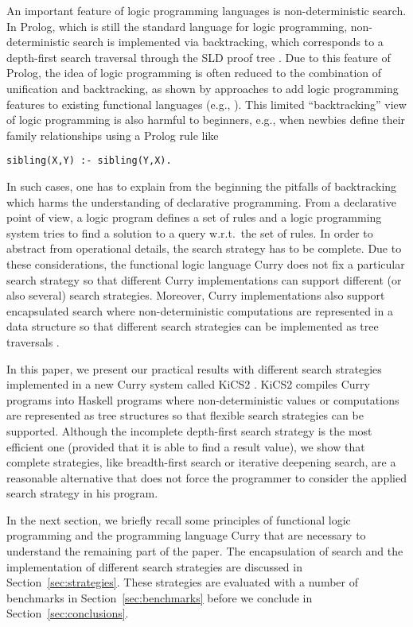 \documentclass[english]{lni}
\begin{document}
An important feature of logic programming languages
is non-deterministic search.
In Prolog, which is still the standard language for logic programming,
non-deterministic search is implemented via backtracking,
which corresponds to a depth-first search traversal
through the SLD proof tree \cite{Lloyd87}.
Due to this feature of Prolog,
the idea of logic programming is often reduced to
the combination of unification and backtracking,
as shown by approaches to add logic programming features
to existing functional languages
(e.g., \cite{ClaessenLjungloef00,Hinze01}).
This limited ``backtracking'' view of logic programming
is also harmful to beginners, e.g., when newbies
define their family relationships using a Prolog rule like
\begin{lstlisting}
sibling(X,Y) :- sibling(Y,X).
\end{lstlisting}
In such cases, one has to explain from the beginning
the pitfalls of backtracking which harms the understanding
of declarative programming.
From a declarative point of view,
a logic program defines a set of rules
and a logic programming system tries to find
a solution to a query w.r.t.\ the set of rules.
In order to abstract from operational details,
the search strategy has to be complete.
Due to these considerations,
the functional logic language Curry \cite{Hanus06Curry}
does not fix a particular search strategy
so that different Curry implementations can support
different (or also several) search strategies.
Moreover, Curry implementations also
support encapsulated search
where non-deterministic computations are represented
in a data structure so that different search strategies
can be implemented as tree traversals
\cite{BrasselHanusHuch04JFLP,HanusSteiner98PLILP,Lux99FLOPS}.

In this paper, we present our practical results
with different search strategies implemented
in a new Curry system called
KiCS2 \cite{BrasselHanusPeemoellerReck11}.
KiCS2 compiles Curry programs into Haskell programs
where non-deterministic values or computations are represented
as tree structures so that flexible search strategies
can be supported.
Although the incomplete depth-first search strategy
is the most efficient one (provided that it is able
to find a result value),
we show that complete strategies,
like breadth-first search or iterative deepening search,
are a reasonable alternative that does not force
the programmer to consider the applied search strategy
in his program.

In the next section, we briefly recall some principles
of functional logic programming and the programming language Curry
that are necessary to understand the remaining part of the paper.
The encapsulation of search and the implementation of different
search strategies are discussed in Section~\ref{sec:strategies}.
These strategies are evaluated with a number of benchmarks
in Section~\ref{sec:benchmarks}
before we conclude in Section~\ref{sec:conclusions}.
\end{document}
